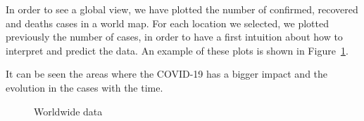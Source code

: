 \documentclass[lang=english,inputenc=utf8,fontsize=10pt]{ldvarticle}
\begin{document}
In order to see a global view, we have plotted the number of confirmed, recovered and deaths cases in a world map. For each location we selected, we plotted previously the number of cases, in order to have a first intuition about how to interpret and predict the data. An example of these plots is shown in Figure~\ref{fig:data}.

It can be seen the areas where the COVID-19 has a bigger impact and the evolution in the cases with the time.

\begin{figure}[H]
	\centering
	\caption{Worldwide data}
	\label{fig:data}
\end{figure}
\end{document}
